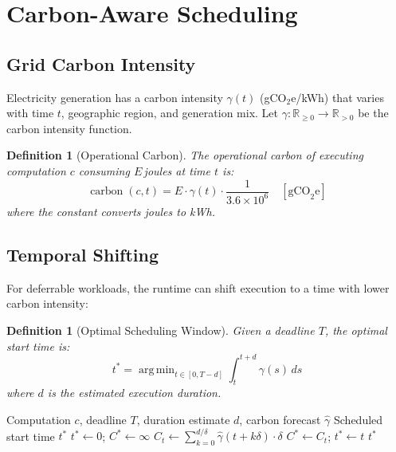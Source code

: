 \documentclass[11pt,a4paper]{article}
\newtheorem{definition}[theorem]{Definition}
\DeclareMathOperator*{\argmin}{arg\,min}
\DeclareMathOperator{\carbon}{carbon}
\begin{document}
\section{Carbon-Aware Scheduling}
\label{sec:carbon-scheduling}

\subsection{Grid Carbon Intensity}

Electricity generation has a carbon intensity $\gamma(t)$ (gCO$_2$e/kWh) that
varies with time $t$, geographic region, and generation mix.  Let
$\gamma : \mathbb{R}_{\geq 0} \to \mathbb{R}_{> 0}$ be the carbon intensity
function.

\begin{definition}[Operational Carbon]
The operational carbon of executing computation $c$ consuming $E$\,joules at
time $t$ is:
\[
  \carbon(c, t) = E \cdot \gamma(t) \cdot \frac{1}{3.6 \times 10^6}
  \quad [\text{gCO}_2\text{e}]
\]
where the constant converts joules to kWh.
\end{definition}

\subsection{Temporal Shifting}

For deferrable workloads, the runtime can shift execution to a time with lower
carbon intensity:

\begin{definition}[Optimal Scheduling Window]
Given a deadline $T$, the optimal start time is:
\[
  t^* = \argmin_{t \in [0, T - d]} \int_t^{t+d} \gamma(s)\, ds
\]
where $d$ is the estimated execution duration.
\end{definition}

\begin{algorithm}[t]
\caption{Carbon-Aware Temporal Shifting}
\label{alg:carbon-shift}
\begin{algorithmic}[1]
\Require Computation $c$, deadline $T$, duration estimate $d$, carbon forecast $\hat{\gamma}$
\Ensure Scheduled start time $t^*$
\State $t^* \gets 0$; $C^* \gets \infty$
  \State $C_t \gets \sum_{k=0}^{d/\delta} \hat{\gamma}(t + k\delta) \cdot \delta$
    \State $C^* \gets C_t$; $t^* \gets t$
  \EndIf
\EndFor
\State \Return $t^*$
\end{algorithmic}
\end{algorithm}
\end{document}
